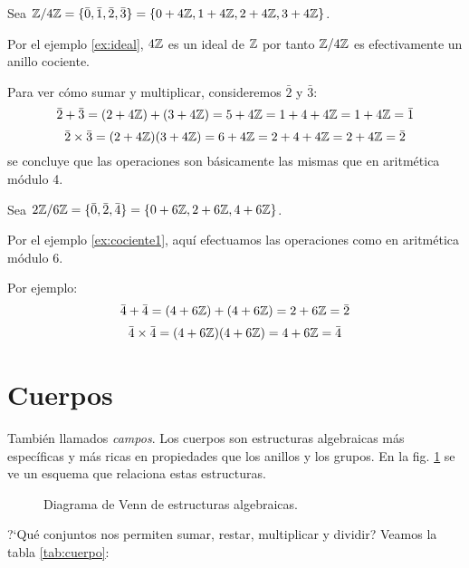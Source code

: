 \begin{fmd-example} \label{ex:cociente1}
	Sea $\mathbb{Z} / 4 \mathbb{Z} = \{ \bar{0}, \bar{1}, \bar{2}, \bar{3} \} = \{ 0 + 4\mathbb{Z}, 1 + 4\mathbb{Z}, 2 + 4\mathbb{Z}, 3 + 4\mathbb{Z} \}$.
	
	Por el ejemplo \ref{ex:ideal}, $4\mathbb{Z}$ es un ideal de $\mathbb{Z}$ por tanto $\mathbb{Z}/4\mathbb{Z}$ es efectivamente un anillo cociente.
	
	Para ver cómo sumar y multiplicar, consideremos $\bar{2}$ y $\bar{3}$:
	\[ \bar{2} + \bar{3} = (2 + 4\mathbb{Z}) + (3 + 4\mathbb{Z}) = 5 + 4\mathbb{Z} = 1 + 4 + 4\mathbb{Z} = 1 + 4\mathbb{Z} = \bar{1} \]
	\[ \bar{2} \times \bar{3} = (2 + 4\mathbb{Z})(3 + 4\mathbb{Z}) = 6 + 4\mathbb{Z} = 2 + 4 + 4\mathbb{Z} = 2 + 4\mathbb{Z} = \bar{2}\]
	se concluye que las operaciones son básicamente las mismas que en aritmética módulo 4.
\end{fmd-example}

\begin{fmd-example}
	Sea $2\mathbb{Z} / 6 \mathbb{Z} = \{ \bar{0}, \bar{2}, \bar{4} \} = \{ 0 + 6\mathbb{Z}, 2 + 6\mathbb{Z}, 4 + 6\mathbb{Z}\}$.
	
	Por el ejemplo \ref{ex:cociente1}, aquí efectuamos las operaciones como en aritmética módulo 6.
	
	Por ejemplo:
	\[ \bar{4} + \bar{4} = (4 + 6\mathbb{Z}) + (4 + 6\mathbb{Z}) = 2 + 6\mathbb{Z} = \bar{2}\]
	\[ \bar{4} \times \bar{4} = (4 + 6\mathbb{Z})(4 + 6\mathbb{Z}) = 4 + 6\mathbb{Z} = \bar{4}\]
\end{fmd-example}


\section{Cuerpos}
También llamados \textit{campos}. Los cuerpos son estructuras algebraicas más específicas y más ricas en propiedades que los anillos y los grupos. En la fig. \ref{fig:gak} se ve un esquema que relaciona estas estructuras.

\begin{figure}[H]
	\centering
	
	\caption{Diagrama de Venn de estructuras algebraicas.}
	\label{fig:gak}
\end{figure}

?`Qué conjuntos nos permiten sumar, restar, multiplicar y dividir? Veamos la tabla \ref{tab:cuerpo}:

